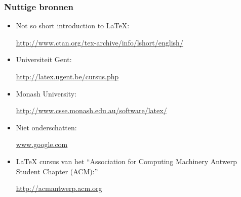 \documentclass{beamer}
\begin{document}
\begin{frame}
\frametitle{Nuttige bronnen}
\begin{itemize}
 \item Not so short introduction to \LaTeX: \begin{tiny}
                                              \url{http://www.ctan.org/tex-archive/info/lshort/english/}
                                            \end{tiny}

 \item Universiteit Gent: \begin{tiny}
                           \url{http://latex.ugent.be/cursus.php}
                          \end{tiny}

 \item Monash University: \begin{tiny}
                           \url{http://www.csse.monash.edu.au/software/latex/}
                          \end{tiny}

 \item Niet onderschatten: \begin{tiny}
                            \url{www.google.com}
                           \end{tiny}
 \item \LaTeX $ $ cursus van het ``Association for Computing Machinery Antwerp Student Chapter (ACM):''
 \begin{tiny}
 \url{http://acmantwerp.acm.org}
 \end{tiny}
\end{itemize}
\end{frame}


% 
% 
% 
\end{document}
